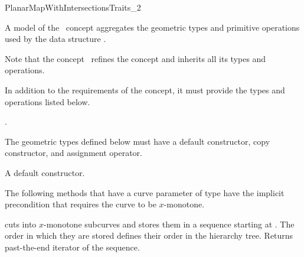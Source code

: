 
\ccRefPageBegin

\begin{ccRefConcept}{PlanarMapWithIntersectionsTraits_2}

\ccDefinition
A model of the \ccRefName\ concept aggregates the geometric types and
primitive operations used by the data structure
.

Note that the concept \ccRefName\ refines the concept 
and inherits all its types and operations.

In addition to the requirements of the  concept, it must
provide the types and operations listed below.

\ccRefines
{} .

\ccTypes

The geometric types defined below must have a default constructor,
copy constructor, and assignment operator.



\ccCreation
    
{A default constructor.}

\ccOperations

The following methods that have a curve parameter of type
 have the implicit precondition that requires the
curve to be $x$-monotone.

	 {cuts  into $x$-monotone subcurves and stores them in a
	   sequence starting at . The order in which they are stored
	   defines their order in the hierarchy tree. Returns past-the-end
	   iterator of the sequence.}


\end{ccRefConcept}
